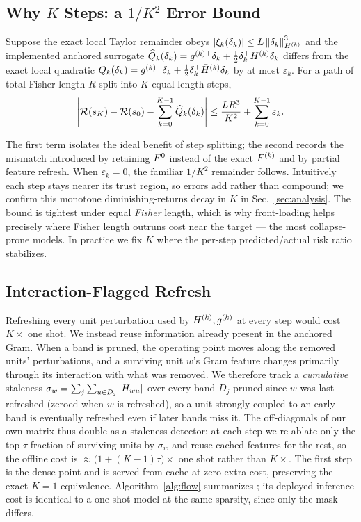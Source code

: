 \subsection{Why $K$ Steps: a $1/K^2$ Error Bound}
\begin{proposition}\label{prop:k2}
Suppose the exact local Taylor remainder obeys
$|\xi_k(\delta_k)|\le L\left\lVert \delta_k \right\rVert_{\bar{H}^{(k)}}^3$ and the implemented anchored surrogate
$\widehat Q_k(\delta_k)=g^{(k)\top}\delta_k+\tfrac12\delta_k^\top H^{(k)}\delta_k$ differs from the
exact local quadratic
$Q_k(\delta_k)=\bar g^{(k)\top}\delta_k+\tfrac12\delta_k^\top\bar{H}^{(k)}\delta_k$
by at most $\varepsilon_k$. For a path of total Fisher length $R$ split into $K$ equal-length steps,
\[
\left|\mathcal{R}(s_K)-\mathcal{R}(s_0)-\sum_{k=0}^{K-1}\widehat Q_k(\delta_k)\right|
\le \frac{L R^3}{K^2}+\sum_{k=0}^{K-1}\varepsilon_k.
\]
\end{proposition}
\noindent The first term isolates the ideal benefit of step splitting; the second records the mismatch
introduced by retaining $F^0$ instead of the exact $F^{(k)}$ and by partial feature refresh.
When $\varepsilon_k{=}0$, the familiar $1/K^2$ remainder follows.
Intuitively each step stays nearer its trust region, so errors add rather than compound; we confirm this
monotone diminishing-returns decay in $K$ in Sec.~\ref{sec:analysis}. The bound is tightest under equal
\emph{Fisher} length, which is why front-loading helps precisely where Fisher length outruns cost near the
target --- the most collapse-prone models. In practice we fix $K$ where the per-step predicted/actual risk
ratio stabilizes.

\subsection{Interaction-Flagged Refresh}
\label{sec:refresh}
Refreshing every unit perturbation used by $H^{(k)},g^{(k)}$ at every step would cost $K\times$ one
shot. We instead reuse information already present in the anchored Gram. When a band is pruned, the
operating point moves along the removed units' perturbations, and a surviving unit $w$'s Gram feature
changes primarily through its interaction with what was removed. We therefore track a
\emph{cumulative} staleness $\sigma_w=\sum_{j}\sum_{u\in D_j}|H_{wu}|$ over every band $D_j$
pruned since $w$ was last refreshed (zeroed when $w$ is refreshed), so a unit strongly coupled to an
early band is eventually refreshed even if later bands miss it. The off-diagonals of our own matrix
thus double as a staleness detector: at each step we re-ablate only the top-$\tau$ fraction of
surviving units by $\sigma_w$ and reuse cached features for the rest, so the offline cost is
$\approx\!\big(1+(K{-}1)\tau\big)\times$ one shot rather than $K\times$. The first step is the dense point and is served from cache at zero extra cost,
preserving the exact $K{=}1$ equivalence. Algorithm~\ref{alg:flow} summarizes \method; its deployed
inference cost is identical to a one-shot model at the same sparsity, since only the mask differs.

